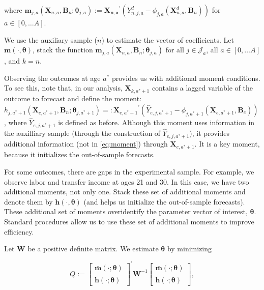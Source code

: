 \noindent where $\bm{m}_{j,a} \left( \bm{X}_{n,a}, \bm{B}_{n} ; \bm{\theta}_{j,a} \right) := {\bm{X_{n,a}}}^{'} \left( Y_{n,j,a}^d -   \phi_{j,a} \left( \bm{X}_{n,a}^d, \bm{B}_{n} \right) \right)$ for $a \in [0, \ldots A]$.

\noindent We use the auxiliary sample ($n$) to estimate the vector of coefficients. Let $\bm{m} \left ( \cdot, \bm{\theta} \right)$, stack the function $\bm{m}_{j,a} \left( \bm{X}_{n,a}, \bm{B}_{n} ; \bm{\theta}_{j,a} \right)$  for all $j \in \mathcal{J}_a$, all $a \in [0, \ldots A]$, and $k = n$.

\noindent Observing the outcomes at age $a^*$ provides us with additional moment conditions. To see this, note that, in our analysis,  $\bm{X}_{k,a^*+1}$ contains a lagged variable of the outcome to forecast and define the moment: $h_{j,a^*+1}  \left( \bm{X}_{e,a^*+1}, \bm{B}_{n} ; \bm{\theta}_{j,a^*+1} \right) =:  {\bm{X}_{e,a^*+1}}^{'} \left( \hat{Y}_{e,j,a^*+1} - \phi_{j,a^*+1} \left ( \bm{X}_{e,a^*+1}, \bm{B}_{e} \right) \right)$, where $\hat{Y}_{e,j,a^*+1}$ is defined as before. Although this moment uses information in the auxilliary sample (through the construction of $\hat{Y}_{e,j,a^*+1}$), it provides additional information (not in \eqref{eq:moment}) through $\bm{X}_{e,a^*+1}$. It is a key moment, because it initializes the out-of-sample forecasts.

\noindent For some outcomes, there are gaps in the experimental sample. For example, we observe labor and transfer income at ages 21 and 30. In this case, we have two additional moments, not only one. Stack these set of additional moments and denote them by $\bm{h} \left ( \cdot, \bm{\theta} \right)$ (and helps us initialize the out-of-sample forecasts). These additional set of moments overidentify the parameter vector of interest, $\bm{\theta}$. Standard procedures allow us to use these set of additional moments to improve efficiency.

\noindent Let $\bm{W}$ be a positive definite matrix. We estimate $\bm{\theta}$ by minimizing

\begin{equation}
Q :=  {\begin{bmatrix} {\bm{\bar{m}} \left( \cdot ; \bm{\theta} \right) }  \\ {\bm{\bar{h}} \left( \cdot ; \bm{\theta} \right) }  \end{bmatrix}}^{'}
\bm{W} ^{-1}{\begin{bmatrix} {\bm{\bar{m}} \left( \cdot ; \bm{\theta} \right) }  \\ {\bm{\bar{h}} \left( \cdot ; \bm{\theta} \right) }  \end{bmatrix}}, \label{eq:wloss}
\end{equation}\\

